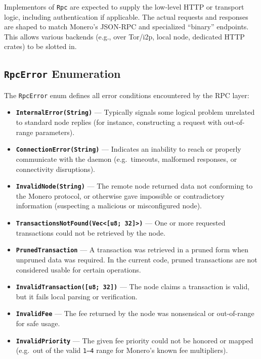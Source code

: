 \documentclass[12pt,a4paper]{article}
\begin{document}
Implementors of \texttt{Rpc} are expected to supply the low-level HTTP or
transport logic, including authentication if applicable.  The actual requests and
responses are shaped to match Monero’s JSON-RPC and specialized “binary”
endpoints.  This allows various backends (e.g., over Tor/i2p, local node,
dedicated HTTP crates) to be slotted in.

\subsection{\texttt{RpcError} Enumeration}
\label{sec:monero-rpc-rpcerror}

The \texttt{RpcError} enum defines all error conditions encountered by the RPC
layer: %

\begin{itemize}
    \item \textbf{\texttt{InternalError(String)}} --- Typically signals some
    logical problem unrelated to standard node replies (for instance,
    constructing a request with out-of-range parameters).

    \item \textbf{\texttt{ConnectionError(String)}} --- Indicates an inability
    to reach or properly communicate with the daemon (e.g.\ timeouts, malformed
    responses, or connectivity disruptions).

    \item \textbf{\texttt{InvalidNode(String)}} --- The remote node returned
    data not conforming to the Monero protocol, or otherwise gave impossible or
    contradictory information (suspecting a malicious or misconfigured node).

    \item \textbf{\texttt{TransactionsNotFound(Vec<[u8; 32]>)}} --- One or more
    requested transactions could not be retrieved by the node.

    \item \textbf{\texttt{PrunedTransaction}} --- A transaction was retrieved in
    a pruned form when unpruned data was required.  In the current code, pruned
    transactions are not considered usable for certain operations.

    \item \textbf{\texttt{InvalidTransaction([u8; 32])}} --- The node claims a
    transaction is valid, but it fails local parsing or verification.

    \item \textbf{\texttt{InvalidFee}} --- The fee returned by the node was
    nonsensical or out-of-range for safe usage.

    \item \textbf{\texttt{InvalidPriority}} --- The given fee priority could not
    be honored or mapped (e.g.\ out of the valid \texttt{1--4} range for
    Monero's known fee multipliers).
\end{itemize}
\end{document}
